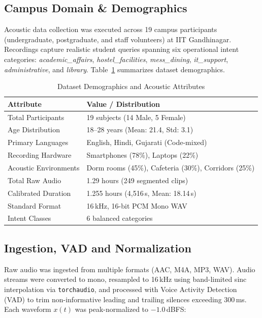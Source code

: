 \documentclass[sigconf,authordraft]{acmart}
\begin{document}
\subsection{Campus Domain \& Demographics}

Acoustic data collection was executed across 19 campus participants (undergraduate,
postgraduate, and staff volunteers) at IIT Gandhinagar. Recordings capture realistic student
queries spanning six operational intent categories: \emph{academic\_affairs},
\emph{hostel\_facilities}, \emph{mess\_dining}, \emph{it\_support}, \emph{administrative},
and \emph{library}. Table~\ref{tab:demographics} summarizes dataset demographics.

\begin{table}[h]
  \caption{Dataset Demographics and Acoustic Attributes}
  \label{tab:demographics}
  \centering
  \small
  \begin{tabular}{ll}
    \toprule
    \textbf{Attribute} & \textbf{Value / Distribution} \\
    \midrule
    Total Participants & 19 subjects (14 Male, 5 Female) \\
    Age Distribution & 18--28 years (Mean: 21.4, Std: 3.1) \\
    Primary Languages & English, Hindi, Gujarati (Code-mixed) \\
    Recording Hardware & Smartphones (78\%), Laptops (22\%) \\
    Acoustic Environments & Dorm rooms (45\%), Cafeteria (30\%), Corridors (25\%) \\
    Total Raw Audio & 1.29 hours (249 segmented clips) \\
    Calibrated Duration & 1.255 hours (4,516\,s, Mean: 18.14\,s) \\
    Standard Format & 16\,kHz, 16-bit PCM Mono WAV \\
    Intent Classes & 6 balanced categories \\
    \bottomrule
  \end{tabular}
\end{table}

\subsection{Ingestion, VAD and Normalization}

Raw audio was ingested from multiple formats (AAC, M4A, MP3, WAV). Audio streams were
converted to mono, resampled to 16\,kHz using band-limited sinc interpolation via
\texttt{torchaudio}, and processed with Voice Activity Detection (VAD) to trim non-informative
leading and trailing silences exceeding 300\,ms. Each waveform $x(t)$ was peak-normalized to $-1.0$\,dBFS:
\end{document}
